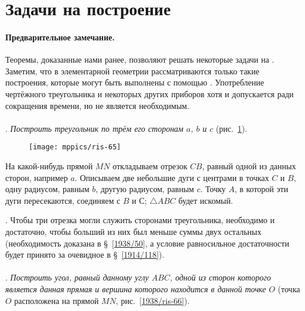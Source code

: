 \section{Задачи на построение}

\paragraph{Предварительное замечание.}\label{1938/61}
Теоремы, доказанные нами ранее, позволяют решать некоторые задачи на .
Заметим, что в элементарной геометрии рассматриваются только такие построения, которые могут быть выполнены с помощью .
Употребление чертёжного треугольника и некоторых других приборов хотя и допускается ради сокращения времени, но не является необходимым.

\paragraph{}\label{1938/62}
.
\emph{Построить треугольник по трём его сторонам $a$, $b$ и $c$} (рис.~\ref{1938/ris-65}).

\begin{figure}[!ht]
\centering
\texttt{[image: mppics/ris-65]}
\caption{}\label{1938/ris-65}
\end{figure}

На какой-нибудь прямой $MN$ откладываем отрезок $CB$, равный одной из данных сторон, например $a$.
Описываем две небольшие дуги с центрами в точках $C$ и $B$, одну радиусом, равным $b$, другую радиусом, равным $c$.
Точку $A$, в которой эти дуги пересекаются, соединяем с $B$ и С;
$\triangle ABC$ будет искомый.

{\small

\smallskip
{}.
Чтобы три отрезка могли служить сторонами треугольника, необходимо и достаточно, чтобы больший из них был меньше суммы двух остальных (необходимость доказана в §~\ref{1938/50}, а условие равносильное достаточности будет принято за очевидное в §~\ref{1914/118}).

}

\paragraph{}\label{1938/63}
.
\emph{Построить угол, равный данному углу $ABC$, одной из сторон которого является данная прямая и вершина которого находится в данной точке $O$} (точка $O$ расположена на прямой $MN$, рис.~\ref{1938/ris-66}).


